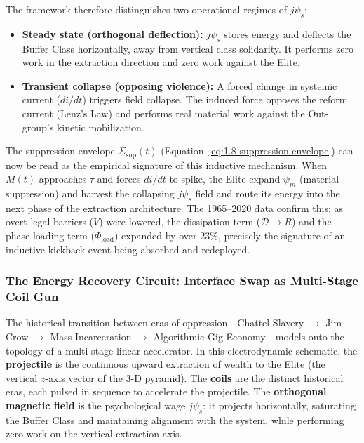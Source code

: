 The framework therefore distinguishes two operational regimes of $j\psi_s$:
\begin{itemize}
    \item \textbf{Steady state (orthogonal deflection):} $j\psi_s$ stores energy and deflects the Buffer Class horizontally, away from vertical class solidarity. It performs zero work in the extraction direction and zero work against the Elite.
    \item \textbf{Transient collapse (opposing violence):} A forced change in systemic current ($di/dt$) triggers field collapse. The induced force opposes the reform current (Lenz's Law) and performs real material work against the Out-group's kinetic mobilization.
\end{itemize}

The suppression envelope $\Sigma_{\text{sup}}(t)$ (Equation~\ref{eq:1.8-suppression-envelope}) can now be read as the empirical signature of this inductive mechanism. When $M(t)$ approaches $\tau$ and forces $di/dt$ to spike, the Elite expand $\psi_m$ (material suppression) and harvest the collapsing $j\psi_s$ field and route its energy into the next phase of the extraction architecture. The 1965--2020 data confirm this: as overt legal barriers ($V$) were lowered, the dissipation term ($\mathcal{D} \rightarrow R$) and the phase-loading term ($\Phi_{\text{load}}$) expanded by over $23\%$, precisely the signature of an inductive kickback event being absorbed and redeployed.

\subsubsection{The Energy Recovery Circuit: Interface Swap as Multi-Stage Coil Gun}

The historical transition between eras of oppression---Chattel Slavery $\rightarrow$ Jim Crow $\rightarrow$ Mass Incarceration $\rightarrow$ Algorithmic Gig Economy---models onto the topology of a multi-stage linear accelerator. In this electrodynamic schematic, the \textbf{projectile} is the continuous upward extraction of wealth to the Elite (the vertical $z$-axis vector of the 3-D pyramid). The \textbf{coils} are the distinct historical eras, each pulsed in sequence to accelerate the projectile. The \textbf{orthogonal magnetic field} is the psychological wage $j\psi_s$: it projects horizontally, saturating the Buffer Class and maintaining alignment with the system, while performing zero work on the vertical extraction axis.

